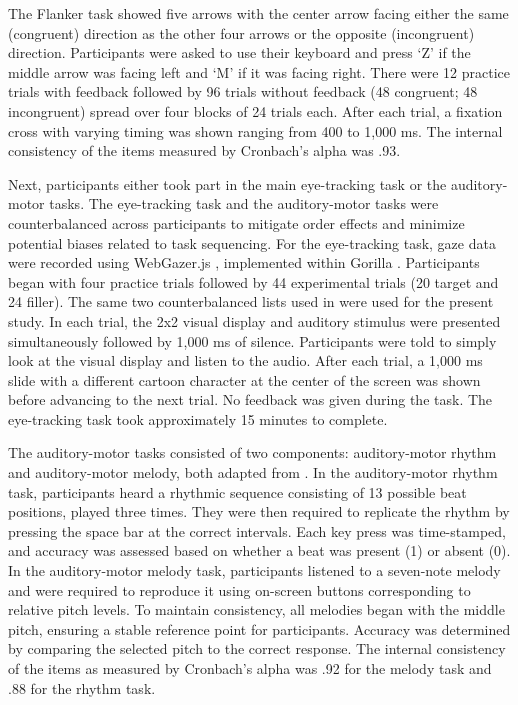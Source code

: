 The Flanker task showed five arrows with the center arrow facing either the same (congruent) direction as the other four arrows or the opposite (incongruent) direction. Participants were asked to use their keyboard and press ‘Z’ if the middle arrow was facing left and ‘M’ if it was facing right. There were 12 practice trials with feedback followed by 96 trials without feedback (48 congruent; 48 incongruent) spread over four blocks of 24 trials each. After each trial, a fixation cross with varying timing was shown ranging from 400 to 1,000 ms. The internal consistency of the items measured by Cronbach’s alpha was .93.

Next, participants either took part in the main eye-tracking task or the auditory-motor tasks. The eye-tracking task and the auditory-motor tasks were counterbalanced across participants to mitigate order effects and minimize potential biases related to task sequencing. For the eye-tracking task, gaze data were recorded using WebGazer.js \citep{Papoutsaki}, implemented within Gorilla \citep{Anwyl-Irvine_2019}. Participants began with four practice trials followed by 44 experimental trials (20 target and 24 filler). The same two counterbalanced lists used in \cite{Ge2021} were used for the present study. In each trial, the 2x2 visual display and auditory stimulus were presented simultaneously followed by 1,000 ms of silence. Participants were told to simply look at the visual display and listen to the audio. After each trial, a 1,000 ms slide with a different cartoon character at the center of the screen was shown before advancing to the next trial. No feedback was given during the task. The eye-tracking task took approximately 15 minutes to complete.

The auditory-motor tasks consisted of two components: auditory-motor rhythm and auditory-motor melody, both adapted from \citep{Kachlicka_Saito_Tierney_2019}. In the auditory-motor rhythm task, participants heard a rhythmic sequence consisting of 13 possible beat positions, played three times. They were then required to replicate the rhythm by pressing the space bar at the correct intervals. Each key press was time-stamped, and accuracy was assessed based on whether a beat was present (1) or absent (0). In the auditory-motor melody task, participants listened to a seven-note melody and were required to reproduce it using on-screen buttons corresponding to relative pitch levels. To maintain consistency, all melodies began with the middle pitch, ensuring a stable reference point for participants. Accuracy was determined by comparing the selected pitch to the correct response. The internal consistency of the items as measured by Cronbach's alpha was .92 for the melody task and .88 for the rhythm task.


